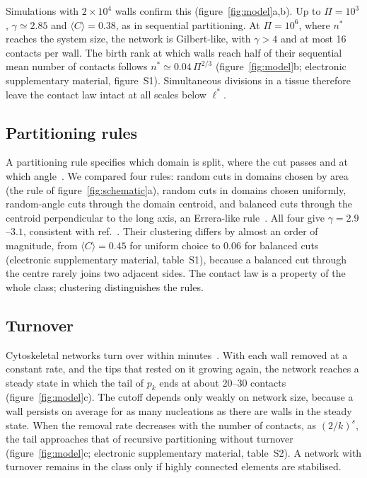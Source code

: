 \documentclass[11pt,a4paper]{article}
\begin{document}
Simulations with $2\times10^4$ walls confirm this (figure~\ref{fig:model}a,b). Up to
$\Pi=10^3$, $\gamma\simeq2.85$ and $\langle C\rangle=0.38$, as in sequential partitioning. At
$\Pi=10^6$, where $n^*$ reaches the system size, the network is Gilbert-like, with $\gamma>4$
and at most 16 contacts per wall. The birth rank at which walls reach half of their sequential
mean number of contacts follows $n^*\simeq0.04\,\Pi^{2/3}$ (figure~\ref{fig:model}b; electronic
supplementary material, figure~S1). Simultaneous divisions in a tissue therefore leave the
contact law intact at all scales below $\ell^*$.

\subsection{Partitioning rules}
\label{sec:rules}

A partitioning rule specifies which domain is split, where the cut passes and at which
angle~\cite{cowan2010}. We compared four rules: random cuts in domains chosen by area (the rule
of figure~\ref{fig:schematic}a), random cuts in domains chosen uniformly, random-angle cuts
through the domain centroid, and balanced cuts through the centroid perpendicular to the long
axis, an Errera-like rule~\cite{errera1888}. All four give $\gamma=2.9$--$3.1$, consistent
with ref.~\cite{vazquez2026div}. Their clustering differs by almost an order of magnitude, from
$\langle C\rangle=0.45$ for uniform choice to $0.06$ for balanced cuts (electronic
supplementary material, table~S1), because a balanced cut through the centre rarely joins two
adjacent sides. The contact law is a property of the whole class; clustering distinguishes the
rules.

\subsection{Turnover}
\label{sec:turnover}

Cytoskeletal networks turn over within minutes~\cite{tojkander2015}. With each wall removed at
a constant rate, and the tips that rested on it growing again, the network reaches a steady
state in which the tail of $p_k$ ends at about $20$--$30$ contacts (figure~\ref{fig:model}c).
The cutoff depends only weakly on network size, because a wall persists on average for as many
nucleations as there are walls in the steady state. When the removal rate decreases with the
number of contacts, as $(2/k)^s$, the tail approaches that of recursive partitioning without
turnover (figure~\ref{fig:model}c; electronic supplementary material, table~S2). A network
with turnover remains in the class only if highly connected elements are stabilised.
\end{document}
